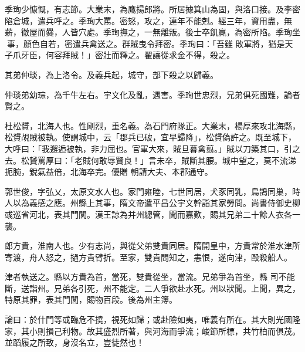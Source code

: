 \begin{pinyinscope}
 季珣少慷慨，有志節。大業末，為鷹揚郎將。所居據箕山為固，與洛口接。及李密陷倉城，遣兵呼之。季珣大罵。密怒，攻之，連年不能剋。經三年，資用盡，無薪，徹屋而爨，人皆穴處。季珣撫之，一無離叛。後士卒飢羸，為密所陷。季珣坐事，顏色自若，密遣兵禽送之。群賊曳令拜密。季珣曰：「吾雖
 敗軍將，猶是天子爪牙臣，何容拜賊！」密壯而釋之。翟讓從求金不得，殺之。



 其弟仲琰，為上洛令。及義兵起，城守，部下殺之以歸義。



 仲琰弟幼琮，為千牛左右。宇文化及亂，遇害。季珣世忠烈，兄弟俱死國難，論者賢之。



 杜松贇，北海人也。性剛烈，重名義。為石門府隊正。大業末，楊厚來攻北海縣，松贇覘賊被執。使謂城中，云「郡兵已破，宜早歸降」，松贇偽許之。既至城下，大呼曰：「我邂逅被執，非力屈也。官軍大來，賊旦暮禽翦。」賊以刀築其口，引之去。松贇罵厚曰：「老賊何敢辱賢良！」言未卒，賊斷其腰。城中望之，莫不流涕扼腕，銳氣益倍，北海卒完。優贈
 朝請大夫、本郡通守。



 郭世俊，字弘乂，太原文水人也。家門雍睦，七世同居，犬豕同乳，鳥鵲同巢，時人以為義感之應。州縣上其事，隋文帝遣平昌公宇文幹詣其家勞問。尚書侍御史柳彧巡省河北，表其門閭。漢王諒為并州總管，聞而嘉歎，賜其兄弟二十餘人衣各一襲。



 郎方貴，淮南人也。少有志尚，與從父弟雙貴同居。隋開皇中，方貴常於淮水津所寄渡，舟人怒之，撾方貴臂折。至家，雙貴問知之，恚恨，遂向津，毆殺船人。



 津者執送之。縣以方貴為首，當死，雙貴從坐，當流。兄弟爭為首坐，縣
 司不能斷，送詣州。兄弟各引死，州不能定。二人爭欲赴水死。州以狀聞。上聞，異之，特原其罪，表其門閭，賜物百段。後為州主簿。



 論曰：於什門等或臨危不撓，視死如歸；或赴險如夷，唯義有所在。其大則光國隆家，其小則損己利物。故其盛烈所著，與河海而爭流；峻節所標，共竹柏而俱茂。並蹈履之所致，身沒名立，豈徒然也！



\end{pinyinscope}